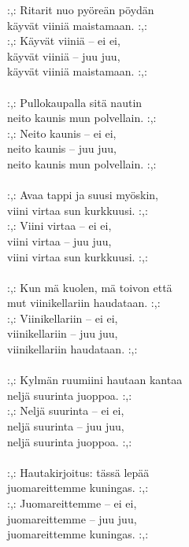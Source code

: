 
            :,: Ritarit nuo pyöreän pöydän \\
            käyvät viiniä maistamaan. :,: \\
            :,: Käyvät viiniä – ei ei, \\
            käyvät viiniä – juu juu, \\
            käyvät viiniä maistamaan. :,: \\
\hspace{10mm} \\
            :,: Pullokaupalla sitä nautin \\
            neito kaunis mun polvellain. :,: \\
            :,: Neito kaunis – ei ei, \\
            neito kaunis – juu juu, \\
            neito kaunis mun polvellain. :,: \\
\hspace{10mm} \\
            :,: Avaa tappi ja suusi myöskin, \\
            viini virtaa sun kurkkuusi. :,: \\
            :,: Viini virtaa – ei ei, \\
            viini virtaa – juu juu, \\
            viini virtaa sun kurkkuusi. :,: \\
\hspace{10mm} \\
            :,: Kun mä kuolen, mä toivon että \\
            mut viinikellariin haudataan. :,: \\
            :,: Viinikellariin – ei ei, \\
            viinikellariin – juu juu, \\
            viinikellariin haudataan. :,: \\
\hspace{10mm} \\
            :,: Kylmän ruumiini hautaan kantaa \\
            neljä suurinta juoppoa. :,: \\
            :,: Neljä suurinta – ei ei, \\
            neljä suurinta – juu juu, \\
            neljä suurinta juoppoa. :,: \\
\hspace{10mm} \\
            :,: Hautakirjoitus: tässä lepää \\
            juomareittemme kuningas. :,: \\
            :,: Juomareittemme – ei ei, \\
            juomareittemme – juu juu, \\
            juomareittemme kuningas. :,: \\

